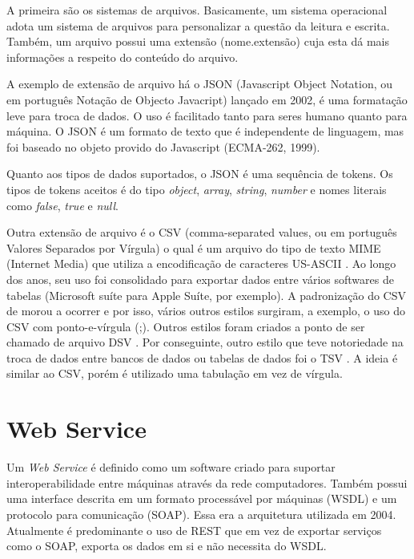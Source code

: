 \documentclass[
	12pt,				%
	openright,			%
	twoside,			%
	a4paper,			%
	english,			%
	brazil				%
	]{abntex2}
\begin{document}
		A primeira são os sistemas de arquivos.
		Basicamente, um sistema operacional adota um sistema de arquivos para personalizar a questão da leitura e escrita. \cite{tanenbaum1995sistemas}
		Também, um arquivo possui uma extensão (nome.extensão) cuja esta dá mais informações a respeito do conteúdo do arquivo.
		\par

		A exemplo de extensão de arquivo há o JSON \cite{json-rfc-8259} \cite{json-jsonOrg} (Javascript Object Notation, ou em português Notação de Objecto Javacript) lançado em 2002, é uma formatação leve para troca de dados. 
		O uso é facilitado tanto para seres humano quanto para máquina.
		O JSON é um formato de texto que é independente de linguagem, mas foi baseado no objeto provido do Javascript (ECMA-262, 1999).
		\par
		Quanto aos tipos de dados suportados, o JSON \cite{json-rfc-8259} é uma sequência de tokens. 
		Os tipos de tokens aceitos é do tipo \textit{object}, \textit{array}, \textit{string}, \textit{number} e nomes literais como \textit{false}, \textit{true} e \textit{null}.
		\par
		Outra extensão de arquivo é o CSV \cite{csv-rfc-4180} (comma-separated values, ou em português Valores Separados por Vírgula) o qual é um arquivo do tipo de texto MIME (Internet Media) \cite{mime-rfc-2048} que utiliza a encodificação de caracteres US-ASCII \cite{csv-rfc-7111}.
		Ao longo dos anos, seu uso foi consolidado para exportar dados entre vários softwares de tabelas (Microsoft suíte para Apple Suíte, por exemplo).
		A padronização do CSV de morou a ocorrer e por isso, vários outros estilos surgiram, a exemplo, o uso do CSV com ponto-e-vírgula (;).
		Outros estilos foram criados a ponto de ser chamado de arquivo DSV \cite{dsv}.
		Por conseguinte, outro estilo que teve notoriedade na troca de dados entre bancos de dados ou tabelas de dados foi o TSV \cite{tsv-iana}.
		A ideia é similar ao CSV, porém é utilizado uma tabulação em vez de vírgula.
		
	\section{Web Service}
		Um \emph{Web Service} \cite{webService-W3C} é definido como um software criado para suportar interoperabilidade entre máquinas através da rede computadores. Também possui uma interface descrita em um formato processável por máquinas (WSDL) e um protocolo para comunicação (SOAP). \cite{webService-W3C}
		Essa era a arquitetura utilizada em 2004. Atualmente é predominante o uso de REST que em vez de exportar serviços como o SOAP, exporta os dados em si e não necessita do WSDL. \cite{soapVSrest}
\end{document}
